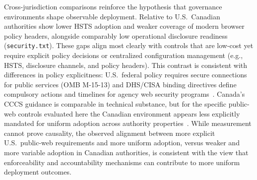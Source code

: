 \documentclass[a4paper,fleqn]{cas-sc}
\begin{document}
    Cross-jurisdiction comparisons reinforce the hypothesis that governance environments shape observable deployment. 
    Relative to U.S.\, Canadian authorities show lower HSTS adoption and weaker coverage of modern browser policy headers, alongside comparably low operational disclosure readiness (\texttt{security.txt}). 
    These gaps align most clearly with controls that are low-cost yet require explicit policy decisions or centralized configuration management (e.g., HSTS, disclosure channels, and policy headers). 
    This contrast is consistent with differences in policy explicitness: U.S.\ federal policy requires secure connections for public services (OMB M-15-13) and DHS/CISA binding directives define compulsory actions and timelines for agency web security programs~\cite{omb-m-15-13,cisa_bod_18_01}.
    Canada’s CCCS guidance is comparable in technical substance, but for the specific public-web controls evaluated here the Canadian environment appears less explicitly mandated for uniform adoption across authority properties~\cite{cccs-itsp-40062,cccs-itsm-60005}.
    While measurement cannot prove causality, the observed alignment between more explicit U.S.\ public-web requirements and more uniform adoption, versus weaker and more variable adoption in Canadian authorities, is consistent with the view that enforceability and accountability mechanisms can contribute to more uniform deployment outcomes.
\end{document}
